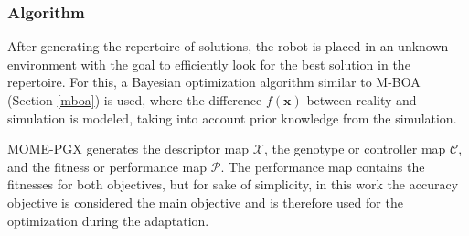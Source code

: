 \documentclass[12pt]{article}
\begin{document}
\subsubsection{Algorithm}
After generating the repertoire of solutions, the robot is placed in an unknown environment with the goal to efficiently look for the best solution in the repertoire. For this, a Bayesian optimization algorithm similar to M-BOA (Section \ref{mboa}) is used, where the difference $f(\mathbf{x})$ between reality and simulation is modeled, taking into account prior knowledge from the simulation. 

MOME-PGX generates the descriptor map $\mathcal{X}$, the genotype or controller map $\mathcal{C}$, and the fitness or performance map $\mathcal{P}$. The performance map contains the fitnesses for both objectives, but for sake of simplicity, in this work the accuracy objective is considered the main objective and is therefore used for the optimization during the adaptation. 
\end{document}
